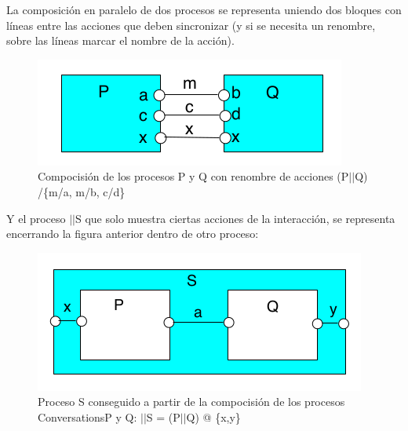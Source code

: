 La composición en paralelo de dos procesos se representa uniendo dos bloques con líneas entre las acciones que deben sincronizar (y si se necesita un renombre, sobre las líneas marcar el nombre de la acción).

\begin{figure}[h]
\centering
	\includegraphics[scale=0.5]{imagenes/bloque_composicion}
	\caption{Compocisión de los procesos P y Q con renombre de acciones (P$||$Q) /\{m/a, m/b, c/d\}}
\end{figure}

Y el proceso $||$S que solo muestra ciertas acciones de la interacción, se representa encerrando la figura anterior dentro de otro proceso:

\begin{figure}[h]
\centering
	\includegraphics[scale=0.5]{imagenes/bloque-proceso-compuesto}
	\caption{Proceso S conseguido a partir de la compocisión de los procesos ConversationsP y Q: $||$S = (P$||$Q) @ \{x,y\}}
\end{figure}






